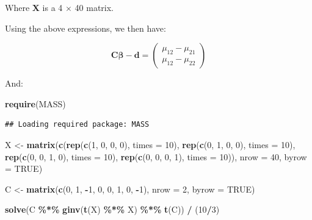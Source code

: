 \documentclass[
]{article}
\newenvironment{Shaded}{\begin{snugshade}}{\end{snugshade}}
\newcommand{\AttributeTok}[1]{\textcolor[rgb]{0.13,0.29,0.53}{#1}}
\newcommand{\ConstantTok}[1]{\textcolor[rgb]{0.56,0.35,0.01}{#1}}
\newcommand{\DecValTok}[1]{\textcolor[rgb]{0.00,0.00,0.81}{#1}}
\newcommand{\FunctionTok}[1]{\textcolor[rgb]{0.13,0.29,0.53}{\textbf{#1}}}
\newcommand{\NormalTok}[1]{#1}
\newcommand{\OtherTok}[1]{\textcolor[rgb]{0.56,0.35,0.01}{#1}}
\newcommand{\SpecialCharTok}[1]{\textcolor[rgb]{0.81,0.36,0.00}{\textbf{#1}}}
\begin{document}
Where \(\boldsymbol{X}\) is a 4 \(\times\) 40 matrix.

Using the above expressions, we then have:

\[
\boldsymbol{C} \boldsymbol{\beta} - \boldsymbol{d} =
\begin{pmatrix}
\mu_{12} - \mu_{21} \\
\mu_{12} - \mu_{22}
\end{pmatrix}
\]

And:

\begin{Shaded}
\begin{Highlighting}[]
\FunctionTok{require}\NormalTok{(MASS) }
\end{Highlighting}
\end{Shaded}

\begin{verbatim}
## Loading required package: MASS
\end{verbatim}

\begin{Shaded}
\begin{Highlighting}[]
\NormalTok{X }\OtherTok{\textless{}{-}} \FunctionTok{matrix}\NormalTok{(}\FunctionTok{c}\NormalTok{(}\FunctionTok{rep}\NormalTok{(}\FunctionTok{c}\NormalTok{(}\DecValTok{1}\NormalTok{, }\DecValTok{0}\NormalTok{, }\DecValTok{0}\NormalTok{, }\DecValTok{0}\NormalTok{), }\AttributeTok{times =} \DecValTok{10}\NormalTok{), }
              \FunctionTok{rep}\NormalTok{(}\FunctionTok{c}\NormalTok{(}\DecValTok{0}\NormalTok{, }\DecValTok{1}\NormalTok{, }\DecValTok{0}\NormalTok{, }\DecValTok{0}\NormalTok{), }\AttributeTok{times =} \DecValTok{10}\NormalTok{), }
              \FunctionTok{rep}\NormalTok{(}\FunctionTok{c}\NormalTok{(}\DecValTok{0}\NormalTok{, }\DecValTok{0}\NormalTok{, }\DecValTok{1}\NormalTok{, }\DecValTok{0}\NormalTok{), }\AttributeTok{times =} \DecValTok{10}\NormalTok{), }
              \FunctionTok{rep}\NormalTok{(}\FunctionTok{c}\NormalTok{(}\DecValTok{0}\NormalTok{, }\DecValTok{0}\NormalTok{, }\DecValTok{0}\NormalTok{, }\DecValTok{1}\NormalTok{), }\AttributeTok{times =} \DecValTok{10}\NormalTok{)), }\AttributeTok{nrow =} \DecValTok{40}\NormalTok{, }\AttributeTok{byrow =} \ConstantTok{TRUE}\NormalTok{)}
  
\NormalTok{C }\OtherTok{\textless{}{-}} \FunctionTok{matrix}\NormalTok{(}\FunctionTok{c}\NormalTok{(}\DecValTok{0}\NormalTok{, }\DecValTok{1}\NormalTok{, }\SpecialCharTok{{-}}\DecValTok{1}\NormalTok{, }\DecValTok{0}\NormalTok{, }
              \DecValTok{0}\NormalTok{, }\DecValTok{1}\NormalTok{, }\DecValTok{0}\NormalTok{, }\SpecialCharTok{{-}}\DecValTok{1}\NormalTok{), }\AttributeTok{nrow =} \DecValTok{2}\NormalTok{, }\AttributeTok{byrow =} \ConstantTok{TRUE}\NormalTok{)}

\FunctionTok{solve}\NormalTok{(C }\SpecialCharTok{\%*\%} \FunctionTok{ginv}\NormalTok{(}\FunctionTok{t}\NormalTok{(X) }\SpecialCharTok{\%*\%}\NormalTok{ X) }\SpecialCharTok{\%*\%} \FunctionTok{t}\NormalTok{(C)) }\SpecialCharTok{/}\NormalTok{ (}\DecValTok{10}\SpecialCharTok{/}\DecValTok{3}\NormalTok{)}
\end{Highlighting}
\end{Shaded}
\end{document}
